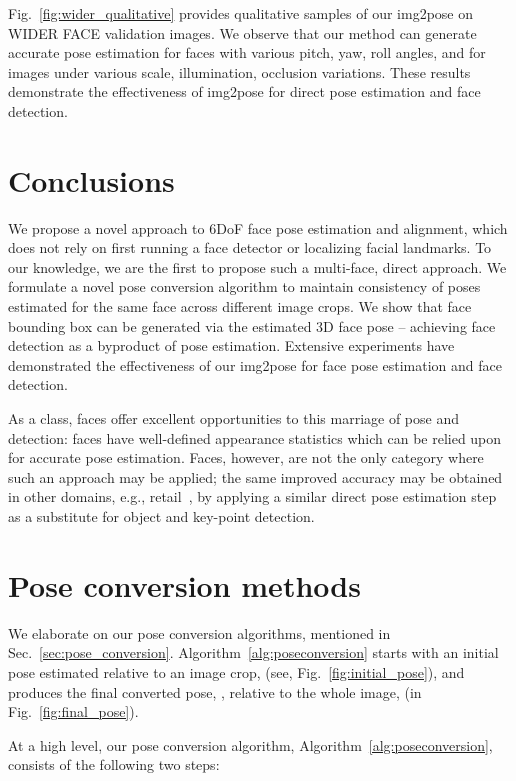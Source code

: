 \documentclass[final]{cvpr}
\begin{document}
Fig.~\ref{fig:wider_qualitative} provides qualitative samples of our img2pose on WIDER FACE validation images. We observe that our method can generate accurate pose estimation for faces with various pitch, yaw, roll angles, and for images under various scale, illumination, occlusion variations. These results demonstrate the effectiveness of img2pose for direct pose estimation and face detection.


\section{Conclusions}
We propose a novel approach to 6DoF face pose estimation and alignment, which does not rely on first running a face detector or localizing facial landmarks. To our knowledge, we are the first to propose such a multi-face, direct approach. We formulate a novel pose conversion algorithm to maintain consistency of poses estimated for the same face across different image crops. We show that face bounding box can be generated via the estimated 3D face pose -- achieving face detection as a byproduct of pose estimation. Extensive experiments have demonstrated the effectiveness of our img2pose for face pose estimation and face detection. 

As a class, faces offer excellent opportunities to this marriage of pose and detection: faces have well-defined appearance statistics which can be relied upon for accurate pose estimation. Faces, however, are not the only category where such an approach may be applied; the same improved accuracy may be obtained in other domains, e.g., retail~\cite{goldman2019precise}, by applying a similar direct pose estimation step as a substitute for object and key-point detection.  


{\small


}

\appendix

\section{Pose conversion methods}\label{sec:append:poseconvert}
We elaborate on our pose conversion algorithms, mentioned in Sec.~\ref{sec:pose_conversion}. Algorithm~\ref{alg:poseconversion} starts with an initial pose  estimated relative to an image crop,  (see, Fig.~\ref{fig:initial_pose}), and produces the final converted pose, , relative to the whole image,  (in Fig.~\ref{fig:final_pose}).

At a high level, our pose conversion algorithm, Algorithm~\ref{alg:poseconversion}, consists of the following two steps:
\end{document}
